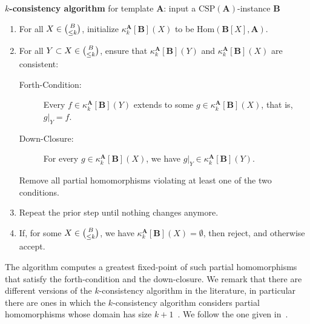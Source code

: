 \documentclass[a4paper,english, thm-restate]{lipics-v2021}
\newcommand{\StructA}{\mathbf{A}}
\newcommand{\StructB}{\mathbf{B}}
\newcommand{\CSP}[1]{\mathrm{CSP}(#1)}
\newcommand{\kcol}[3]{\kappa_{#1}^{#2}[#3]}
\newcommand{\restrict}[2]{#1|_{#2}}
\newcommand{\Hom}[2]{\mathrm{Hom}(#1,#2)}
\begin{document}
	\begin{algobox}{\textbf{$k$-consistency algorithm} for template $\StructA$: input  a $\CSP{\StructA}$-instance $\StructB$}
		\begin{enumerate}[leftmargin=15pt]
			\item For all $X \in \tbinom{B} {\leq k}$,
			initialize  $\kcol{k}{\StructA}{\StructB}(X)$ to be $\Hom{\StructB[X]}{\StructA}$.
			\item For all $Y \subset X \in \tbinom{B} {\leq k}$,
			ensure that $\kcol{k}{\StructA}{\StructB}(Y)$ and $\kcol{k}{\StructA}{\StructB}(X)$ are consistent:
			\begin{description}
				\item[Forth-Condition:] Every $f \in \kcol{k}{\StructA}{\StructB}(Y)$
				extends to some $g \in \kcol{k}{\StructA}{\StructB}(X)$,
				that is, $\restrict{g}{Y}=f$.
				\item[Down-Closure:] For every $g \in \kcol{k}{\StructA}{\StructB}(X)$,
				we have $\restrict{g}{Y} \in \kcol{k}{\StructA}{\StructB}(Y)$.
			\end{description}
			Remove all partial homomorphisms violating at least one of the two conditions.
			\item Repeat the prior step until nothing changes anymore.
			\item If, for some $X \in \tbinom{B}{\leq k}$,
			we have $\kcol{k}{\StructA}{\StructB}(X)= \emptyset$,
			then reject, and otherwise accept.
		\end{enumerate}
	\end{algobox}
	\noindent The algorithm computes a greatest fixed-point
	of such partial homomorphisms that satisfy the forth-condition
	and the down-closure.
	We remark that there are different versions of the $k$\nobreakdash-consistency algorithm in the literature, in particular there are ones in which the $k$-consistency algorithm considers partial homomorphisms whose domain has size $k+1$~\cite{AtseriasBulatovDalmau2007}.
	We follow the one given in~\cite{DalmauOprsal2024}.
	
	
\end{document}
